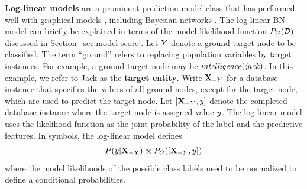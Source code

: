 \documentclass{acm_proc_article-sp}
\begin{document}
\textbf{Log-linear models} are a prominent prediction model class that has performed well with graphical models \cite{Taskar2002,Domingos2009,Sutton2007}, including Bayesian networks \cite{Schulte2012}. The log-linear BN model can briefly be explained in terms of the model likelihood function $P_{G}(\mathcal{D})$ discussed in Section~\ref{sec:model-score}. Let $Y$ denote a ground target node to be classified. The term ``ground'' refers to replacing population variables by target instances. For example, a ground target node may be $\it{intelligence}(jack)$. In this example, we refer to Jack as the \textbf{target entity}. Write $\mathbf{X}_{-Y}$ for a database instance that specifies the values of all ground nodes, except for the target node, which are used to predict the target node. Let $[\mathbf{X}_{-Y},y]$ denote the completed database instance where the target node is assigned value $y$. The log-linear model uses the likelihood function as the joint probability of the label and the predictive features. In symbols, the log-linear model defines
\begin{equation} \label{eq:classify}
P(y|\mathbf{X_{-Y}}) \propto P_{G}([\mathbf{X}_{-Y},y])
\end{equation}
where the model likelihoods of the possible class labels need to be normalized to define a conditional probabilities. 
%
%
%
\end{document}
